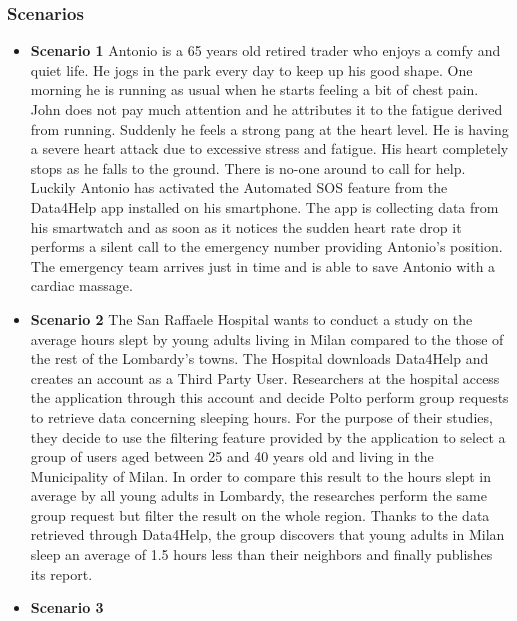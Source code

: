 \documentclass[titlepage]{article}
\begin{document}
		\subsubsection{Scenarios}
			
				\begin{itemize}
					\item {\bf Scenario 1} \linebreak
					Antonio is a 65 years old retired trader who enjoys a comfy and quiet life. 
					He jogs in the park every day to keep up his good shape. One morning he is running as usual when 					he starts feeling a bit of chest pain. John does not pay much attention and he attributes it to the 					fatigue derived from running. Suddenly he feels a strong pang at the heart level. He is having a 					severe heart attack due to excessive stress and fatigue. His heart completely stops as he falls to 					the ground. There is no-one around to call for help. Luckily Antonio has activated the Automated 					SOS feature from the Data4Help app installed on his smartphone. The app is collecting data from 					his smartwatch and as soon as it notices the sudden heart rate drop it performs a silent call to the 					emergency number providing Antonio’s position. The emergency team arrives just in time and is 					able to save Antonio with a cardiac massage.
					\item {\bf Scenario 2} \linebreak
					The San Raffaele Hospital wants to conduct a study on the average hours slept by young adults 					living in Milan compared to the those of the rest of the Lombardy’s towns. The Hospital downloads 					Data4Help and creates an account as a Third Party User. Researchers at the hospital access the 					application through this account  and decide Polto perform group requests to retrieve data 						concerning sleeping hours. 
					For the purpose of their studies, they decide to use the filtering feature provided by the application 					to select a group of users aged between 25 and 40 years old and living in the Municipality of Milan. 					In order to compare this result to the hours slept in average by all young adults in Lombardy, the 					researches perform the same group request but filter the result on the whole region. 
					Thanks to the data retrieved through Data4Help, the group discovers that young adults in Milan 					sleep an average of 1.5 hours less than their neighbors and finally publishes its report.
					\item {\bf Scenario 3} \linebreak

\end{itemize}
\end{document}
